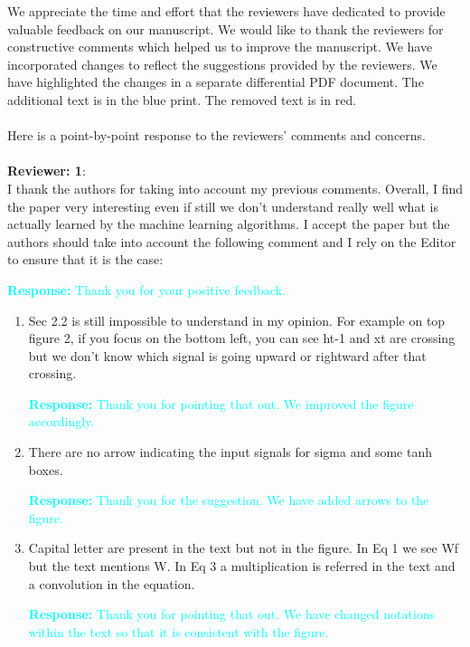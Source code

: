 \documentclass[11pt,a2paper]{report}
\begin{document}
	
	\noindent We appreciate the time and effort that the reviewers have dedicated to provide valuable feedback on our manuscript. 
	We would like to thank the reviewers for constructive comments which helped us to improve the manuscript. 
	We have incorporated changes to reflect the suggestions provided by the reviewers. 
	We have highlighted the changes in a separate differential PDF document. The additional text is in the blue print. 
	The removed text is in red. \\ \\
	Here is a point-by-point response to the reviewers’ comments and concerns.
	\\ \\
	\textbf{Reviewer: 1}: \\
	I thank the authors for taking into account my previous comments. 
	Overall, I find the paper very interesting even if still we don't understand really well what is actually learned by the machine learning algorithms. 
	I accept the paper but the authors should take into account the following comment and I rely on the Editor to ensure that it is the case:
	
	\textcolor{Cyan}{
		\textbf{Response:}
	Thank you for your positive feedback.
    }
	\begin{enumerate}
		\item Sec 2.2 is still impossible to understand in my opinion. 
		For example on top figure 2, if you focus on the bottom left, you can see ht-1 and xt are crossing but we don't know which signal is going upward or rightward after that crossing.
		
		\textcolor{Cyan}{
			\textbf{Response:}
		Thank you for pointing that out. We improved the figure accordingly.
		}
		
		\item There are no arrow indicating the input signals for sigma and some tanh boxes.
		
		\textcolor{Cyan}{
			\textbf{Response:}
			Thank you for the suggestion. We have added arrows to the figure.
		}
		\item Capital letter are present in the text but not in the figure. 
		In Eq 1 we see Wf but the text mentions W. 
		In Eq 3 a multiplication is referred in the text and a convolution in the equation.
		
		\textcolor{Cyan}{
			\textbf{Response:}
			Thank you for pointing that out. We have changed notations within the text so that it is consistent with the figure.
		}		
	\end{enumerate}	
	
\end{document}
